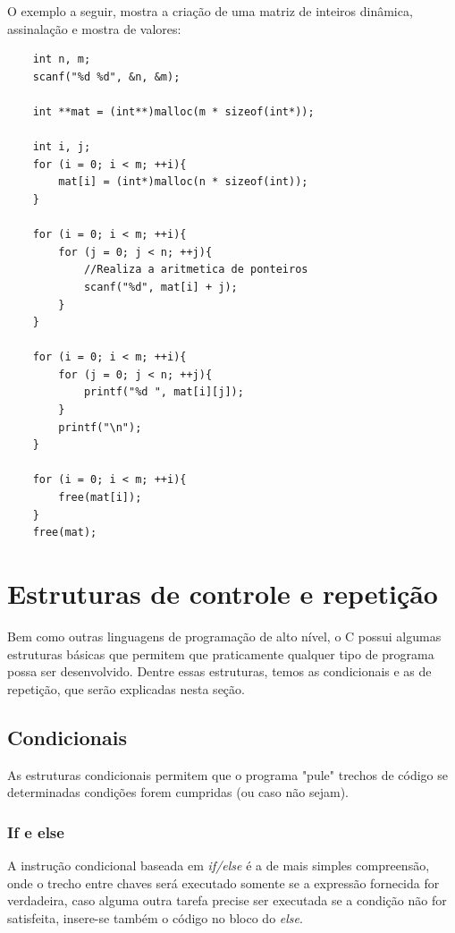 \documentclass[12pt]{article}
\newcommand\tab[1][1cm]{\hspace*{#1}}
\begin{document}
\par\tab O exemplo a seguir, mostra a criação de uma matriz de inteiros dinâmica, assinalação e mostra de valores:

\hspace{0.25cm}
\begin{lstlisting}
    int n, m;
    scanf("%d %d", &n, &m);

    int **mat = (int**)malloc(m * sizeof(int*));
    
    int i, j;
    for (i = 0; i < m; ++i){
        mat[i] = (int*)malloc(n * sizeof(int));
    }
    
    for (i = 0; i < m; ++i){
        for (j = 0; j < n; ++j){
            //Realiza a aritmetica de ponteiros
            scanf("%d", mat[i] + j);
        }
    }
    
    for (i = 0; i < m; ++i){
        for (j = 0; j < n; ++j){
            printf("%d ", mat[i][j]);
        }
        printf("\n");
    }
    
    for (i = 0; i < m; ++i){
        free(mat[i]);
    }
    free(mat);
\end{lstlisting}

\newpage

\section{Estruturas de controle e repetição}

\par\tab Bem como outras linguagens de programação de alto nível, o C possui algumas estruturas básicas que permitem que praticamente qualquer tipo de programa possa ser desenvolvido. Dentre essas estruturas, temos as condicionais e as de repetição, que serão explicadas nesta seção.

\subsection{Condicionais}

\par\tab As estruturas condicionais permitem que o programa "pule" trechos de código se determinadas condições forem cumpridas  (ou caso não sejam).

\subsubsection{If e else}

\par\tab A instrução condicional baseada em \textit{if/else} é a de mais simples compreensão, onde o trecho entre chaves será executado somente se a expressão fornecida for verdadeira, caso alguma outra tarefa precise ser executada se a condição não for satisfeita, insere-se também o código no bloco do \textit{else}.
\end{document}
